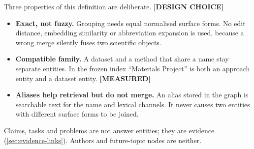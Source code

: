 \documentclass[11pt,a4paper]{article}
\newcommand{\cref}[1]{\autoref{#1}}
\theoremstyle{remark}
\newcommand{\vtag}[2]{{\sffamily\scriptsize\bfseries\textcolor{#1}{[#2]}}}
\newcommand{\Mtag}{\vtag{measgreen}{MEASURED}}
\newcommand{\Dtag}{\vtag{black!60}{DESIGN CHOICE}}
\begin{document}
Three properties of this definition are deliberate. \Dtag
\begin{itemize}
  \item \textbf{Exact, not fuzzy.} Grouping needs equal normalised surface forms. No edit
        distance, embedding similarity or abbreviation expansion is used, because a wrong
        merge silently fuses two scientific objects.
  \item \textbf{Compatible family.} A dataset and a method that share a name stay separate
        entities. In the frozen index ``Materials Project'' is both an approach entity
        and a dataset entity. \Mtag
  \item \textbf{Aliases help retrieval but do not merge.} An alias stored in the graph is
        searchable text for the name and lexical channels. It never causes two entities
        with different surface forms to be joined.
\end{itemize}
Claims, tasks and problems are not answer entities; they are evidence
(\cref{sec:evidence-links}). Authors and future-topic nodes are neither.
\end{document}
